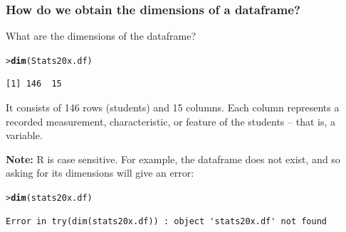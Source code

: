 \documentclass{beamer}\usepackage[]{graphicx}\usepackage[]{xcolor}
\makeatletter
\newcommand{\hlstd}[1]{\textcolor[rgb]{0.345,0.345,0.345}{#1}}%
\newcommand{\hlkwd}[1]{\textcolor[rgb]{0.737,0.353,0.396}{\textbf{#1}}}%
\newenvironment{kframe}{%
 \def\at@end@of@kframe{}%
 \ifinner\ifhmode%
  \def\at@end@of@kframe{\end{minipage}}%
  \begin{minipage}{\columnwidth}%
 \fi\fi%
 \def\FrameCommand##1{\hskip\@totalleftmargin \hskip-\fboxsep
 \colorbox{shadecolor}{##1}\hskip-\fboxsep
     \hskip-\linewidth \hskip-\@totalleftmargin \hskip\columnwidth}%
 \MakeFramed {\advance\hsize-\width
   \@totalleftmargin\z@ \linewidth\hsize
   \@setminipage}}%
 {\par\unskip\endMakeFramed%
 \at@end@of@kframe}
\newenvironment{knitrout}{}{} %
\makeatother
\begin{document}
\begin{frame}[fragile]
\frametitle{How do we obtain the dimensions of a dataframe?}

What are the dimensions of the  dataframe?
\begin{knitrout}\scriptsize
{}\color{fgcolor}\begin{kframe}
\begin{alltt}
\hlstd{> }\hlkwd{dim}\hlstd{(Stats20x.df)}
\end{alltt}
\begin{verbatim}
[1] 146  15
\end{verbatim}
\end{kframe}
\end{knitrout}
It consists of 146 rows (students) and 15 columns. Each column represents a recorded measurement, characteristic, or feature of the students -- that is, a variable.

\medskip
{\bf Note:} {\rcode R} is case sensitive. For example, the dataframe  does not exist, and so asking for its dimensions will give an error:

\begin{knitrout}\scriptsize
{}\color{fgcolor}\begin{kframe}
\begin{alltt}
\hlstd{> }\hlkwd{dim}\hlstd{(stats20x.df)}
\end{alltt}
\end{kframe}
\end{knitrout}

\begin{knitrout}\scriptsize
{}\color{fgcolor}\begin{kframe}
\begin{verbatim}
Error in try(dim(stats20x.df)) : object 'stats20x.df' not found
\end{verbatim}
\end{kframe}
\end{knitrout}

\end{frame}
\end{document}
